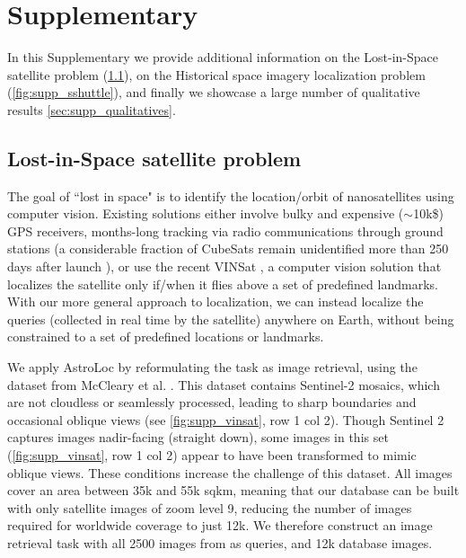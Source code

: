 
\clearpage
\setcounter{page}{1}
\maketitlesupplementary

\section{Supplementary}
In this Supplementary we provide additional information on the Lost-in-Space satellite problem (\cref{sec:supp_lost_in_space}),
on the Historical space imagery localization problem (\cref{fig:supp_sshuttle}), and finally we showcase a large number of qualitative results \cref{sec:supp_qualitatives}.


\subsection{Lost-in-Space satellite problem}
\label{sec:supp_lost_in_space}

 The goal of ``lost in space" is to identify the location/orbit of nanosatellites using computer vision. Existing solutions either involve bulky and expensive ($\sim$10k\$) GPS receivers, months-long tracking via radio communications through ground stations \cite{Skinner_2022_cubesat_radar} (a considerable fraction of CubeSats remain
unidentified more than 250 days after launch \cite{McCleary_2024_vinsat}), or use the recent VINSat \cite{McCleary_2024_vinsat}, a computer vision solution that localizes the satellite only if/when it flies above a set of predefined landmarks.
With our more general approach to localization, we can instead localize the queries (collected in real time by the satellite) anywhere on Earth, without being constrained to a set of predefined locations or landmarks.

We apply AstroLoc by reformulating the task as image retrieval, using the dataset from McCleary et al. \cite{McCleary_2024_vinsat}. This dataset contains Sentinel-2 mosaics, which are not cloudless or seamlessly processed, leading to sharp boundaries and occasional oblique views (see \cref{fig:supp_vinsat}, row 1 col 2). 
Though Sentinel 2 captures images nadir-facing (straight down), some images in this set (\cref{fig:supp_vinsat}, row 1 col 2) appear to have been transformed to mimic oblique views. These conditions increase the challenge of this dataset. All images cover an area between 35k and 55k sqkm, meaning that our database can be built with only satellite images of zoom level 9, reducing the number of images required for worldwide coverage to just 12k.
We therefore construct an image retrieval task with all 2500 images from \cite{McCleary_2024_vinsat} as queries, and 12k database images.

